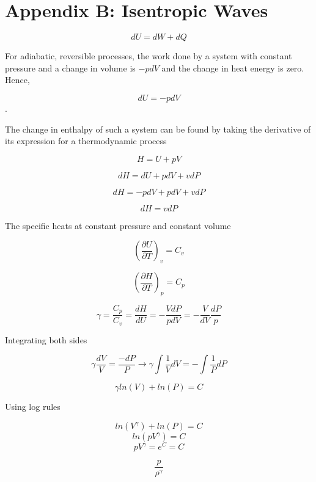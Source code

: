 \section{Appendix B: Isentropic Waves}

\[dU = dW + dQ\]

For adiabatic, reversible processes, the work done by a system with constant pressure and a change in volume is $-pdV$ and the change in heat energy is zero. Hence,

\[dU = -pdV\].

The change in enthalpy of such a system can be found by taking the derivative of its expression for a thermodynamic process 

\[H = U + pV\]

\[dH = dU + pdV + vdP\]

\[dH = -pdV + pdV + vdP\]

\[dH = vdP\]

The specific heats at constant pressure and constant volume 

\[\left(\frac{\partial U}{\partial T}\right)_v = C_v\]

\[\left(\frac{\partial H}{\partial T}\right)_p = C_p\]

\[\gamma = \frac{C_p}{C_v} = \frac{dH}{dU} = -\frac{VdP}{pdV} = -\frac{V}{dV}\frac{dP}{p}\]

Integrating both sides

\[\gamma \frac{dV}{V} = \frac{-dP}{P} \rightarrow \gamma \int \frac{1}{V} dV = - \int \frac{1}{P} dP\]

\[\gamma ln(V) + ln(P) = C\]

Using log rules

\[ln(V^\gamma) + ln(P) = C\]
 \[ln(pV^\gamma) = C \]
 \[pV^\gamma = e^C = C\]
 
 \[\frac{p}{\rho^\gamma}\]
